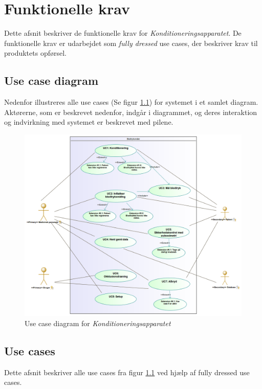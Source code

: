 \chapter{Funktionelle krav}
Dette afsnit beskriver de funktionelle krav for \textit{Konditioneringsapparatet}. De funktionelle krav er udarbejdet som \textit{fully dressed} use cases, der beskriver krav til produktets opførsel.

\section{Use case diagram}
Nedenfor illustreres alle use cases (Se figur \ref{fig:usecasedia}) for systemet i et samlet diagram. Aktørerne, som er beskrevet nedenfor, indgår i diagrammet, og deres interaktion og indvirkning med systemet er beskrevet med pilene. 
\begin{figure}[H]
	\centering
	\includegraphics[width=\textwidth]{Kravspecifikation/SysML/UCD.png}
	\caption{Use case diagram for \textit{Konditioneringsapparatet}} \label{fig:usecasedia}
\end{figure}



\newpage

\section{Use cases}
Dette afsnit beskriver alle use cases fra figur \ref{fig:usecasedia} ved hjælp af fully dressed use cases. 
	
	
	
	
	
	
	
	
	
	
	
	
	
	
	
